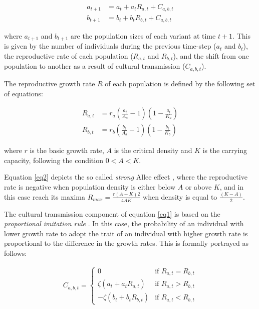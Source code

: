\documentclass[3p,authoryear,twocolumn]{elsarticle} %
\begin{document}
\begin{equation}
\begin{aligned}
a_{t+1}& = a_t + a_t R_{a,t} + C_{a,b,t} \\
b_{t+1}& = b_t + b_t R_{b,t} + C_{a,b,t}
\label{eq1}
\end{aligned}
\end{equation}

where $a_{t+1}$ and $b_{t+1}$ are the population sizes of each variant at time $t+1$. This is given by the number of individuals during the previous time-step ($a_t$ and $b_t$), the reproductive rate of each population ($R_{a,t}$ and $R_{b,t}$), and the shift from one population to another as a result of cultural transmission ($C_{a,b,t}$).

The reproductive growth rate $R$ of each population is defined by the following set of equations:

\begin{equation}
\begin{aligned}
R_{a,t}& = r_a (\frac{a_t}{A_a}-1)(1-\frac{a_t}{K_a})\\
R_{b,t}& = r_b (\frac{b_t}{A_b}-1)(1-\frac{b_t}{K_b}) 
\label{eq2}
\end{aligned}
\end{equation}

where $r$ is the basic growth rate, $A$ is the critical density and $K$ is the carrying capacity, following the condition $0<A < K$. 

Equation \eqref{eq2} depicts the so called \emph{strong} Allee effect \citep{Wang_and_Kot_2001}, where the reproductive rate is negative when population density is either below $A$ or above $K$, and  in this case reach its maxima $R_{max}=\frac{r(A-K)2}{4AK}$ when density is equal to $\frac{(K-A)}{2}$. 

The cultural transmission component of equation \eqref{eq1} is based on the \emph{proportional imitation rule} \citep{schlag1998}. In this case, the probability of an individual with lower growth rate to adopt the trait of an individual with higher growth rate is proportional to the difference in the growth rates. This is formally portrayed as follows:

\begin{equation}
\begin{aligned}
\label{eq3}
C_{a,b,t} = 
\begin{cases}
0& \text{if } R_{a,t} = R_{b,t}\\
\zeta(a_t+a_tR_{a,t})& \text{if } R_{a,t} > R_{b,t}\\
-\zeta(b_t+b_tR_{b,t})& \text{if } R_{a,t} < R_{b,t}
\end{cases}
\end{aligned}
\end{equation}
\end{document}
